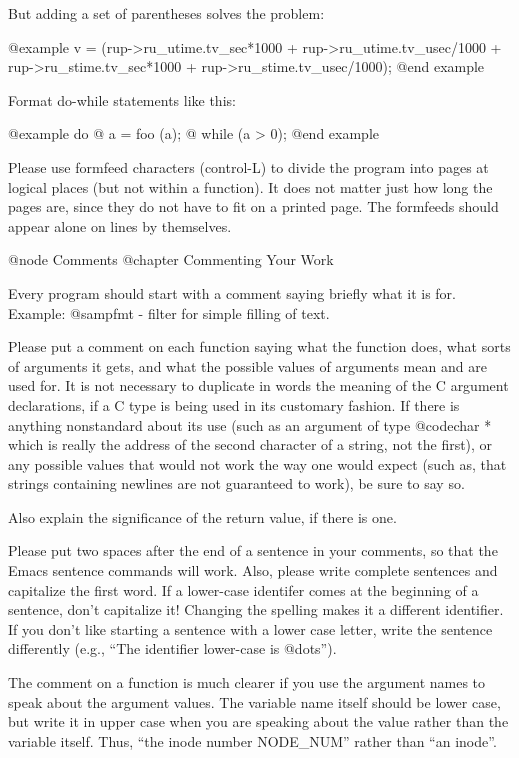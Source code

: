 But adding a set of parentheses solves the problem:

@example
v = (rup->ru_utime.tv_sec*1000 + rup->ru_utime.tv_usec/1000
     + rup->ru_stime.tv_sec*1000 + rup->ru_stime.tv_usec/1000);
@end example

Format do-while statements like this:

@example
do
  @{
    a = foo (a);
  @}
while (a > 0);
@end example

Please use formfeed characters (control-L) to divide the program into
pages at logical places (but not within a function).  It does not matter
just how long the pages are, since they do not have to fit on a printed
page.  The formfeeds should appear alone on lines by themselves.


@node Comments
@chapter Commenting Your Work

Every program should start with a comment saying briefly what it is for.
Example: @samp{fmt - filter for simple filling of text}.

Please put a comment on each function saying what the function does,
what sorts of arguments it gets, and what the possible values of
arguments mean and are used for.  It is not necessary to duplicate in
words the meaning of the C argument declarations, if a C type is being
used in its customary fashion.  If there is anything nonstandard about
its use (such as an argument of type @code{char *} which is really the
address of the second character of a string, not the first), or any
possible values that would not work the way one would expect (such as,
that strings containing newlines are not guaranteed to work), be sure
to say so.

Also explain the significance of the return value, if there is one.

Please put two spaces after the end of a sentence in your comments, so
that the Emacs sentence commands will work.  Also, please write
complete sentences and capitalize the first word.  If a lower-case
identifer comes at the beginning of a sentence, don't capitalize it!
Changing the spelling makes it a different identifier.  If you don't
like starting a sentence with a lower case letter, write the sentence
differently (e.g., ``The identifier lower-case is @dots{}'').

The comment on a function is much clearer if you use the argument
names to speak about the argument values.  The variable name itself
should be lower case, but write it in upper case when you are speaking
about the value rather than the variable itself.  Thus, ``the inode
number NODE_NUM'' rather than ``an inode''.

